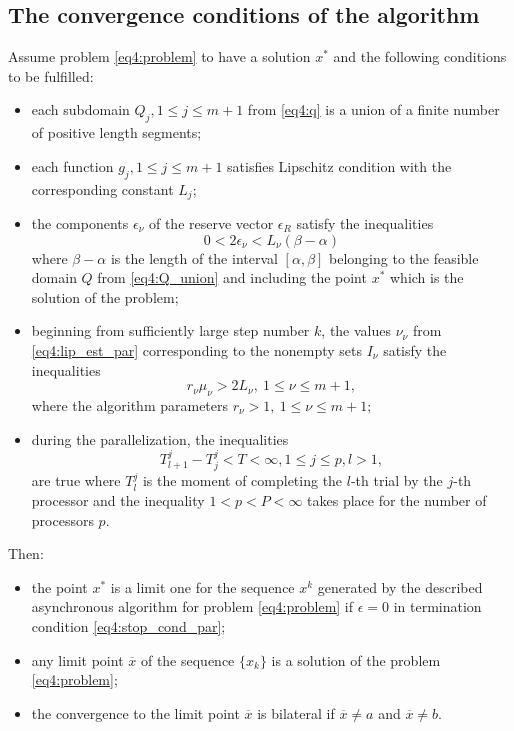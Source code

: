\subsection{The convergence conditions of the algorithm}
\begin{theorem}
  \label{th4:convergence_par}
  Assume problem \eqref{eq4:problem} to have a solution $x^*$ and the following conditions to be fulfilled:
  \begin{itemize}
    \item each subdomain $Q_j ,1\le j\le m+1$ from \eqref{eq4:q} is a union of a finite number of positive length segments;
    \item each function $g_j ,1\le j\le m+1$ satisfies Lipschitz condition with the corresponding constant $L_j$;
    \item the components $\epsilon_\nu$ of the reserve vector $\epsilon_R$ satisfy the inequalities
    \begin{equation}
      \label{eq4:reserves_par}
      0<2\epsilon_\nu<L_\nu(\beta-\alpha)
    \end{equation}
    where $\beta-\alpha$ is the length of the interval $[\alpha,\beta]$ belonging to the feasible domain $Q$ from \eqref{eq4:Q_union} and including the point $x^*$ which is the solution of the problem;
    \item beginning from sufficiently large step number $k$, the values $\nu_\nu$ from \eqref{eq4:lip_est_par} corresponding to the nonempty sets $I_\nu$ satisfy the inequalities
    \begin{equation}
      r_\nu\mu_\nu>2L_\nu,\:1\le\nu\le m+1,
    \end{equation}
    where the algorithm parameters $r_\nu>1,\:1\le\nu\le m+1$;
    \item during the parallelization, the inequalities
    \begin{displaymath}
      T^j_{l+1}-T^j_j<T<\infty,1\le j\le p, l>1,
    \end{displaymath}
    are true where $T_l^j$ is the moment of completing the $l$-th trial by the $j$-th processor and the inequality $1<p<P<\infty$ takes place for the number of processors $p$.
  \end{itemize}
  Then:
  \begin{itemize}
    \item the point $x^*$ is a limit one for the sequence ${x^k }$ generated by the described asynchronous algorithm for problem \eqref{eq4:problem} if $\epsilon=0$ in termination condition \eqref{eq4:stop_cond_par};
    \item any limit point $\overline x$ of the sequence $\{x_k \}$ is a solution of the problem \eqref{eq4:problem};
    \item the convergence to the limit point $\overline x$ is bilateral if $\overline x\not=a$ and $\overline x\not=b$.
  \end{itemize}
\end{theorem}

